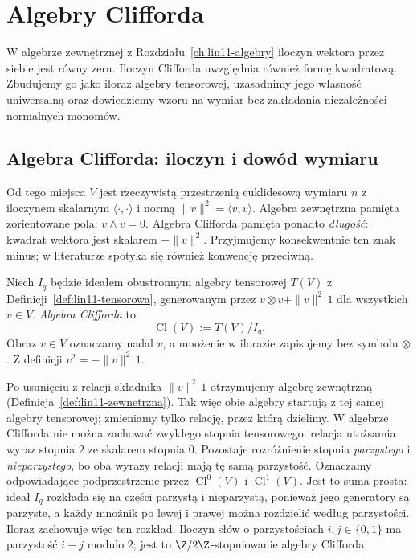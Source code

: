 \chapter{Algebry Clifforda}
\label{ch:lin30-clifford}

W algebrze zewnętrznej z Rozdziału~\ref{ch:lin11-algebry}
iloczyn wektora przez siebie jest równy zeru.
Iloczyn Clifforda uwzględnia również formę kwadratową.
Zbudujemy go jako iloraz algebry tensorowej, uzasadnimy jego
własność uniwersalną oraz dowiedziemy wzoru na wymiar
bez zakładania niezależności normalnych monomów.

\section{Algebra Clifforda: iloczyn i dowód wymiaru}
\label{sec:lin30-clifford}

Od tego miejsca $V$ jest rzeczywistą przestrzenią
euklidesową wymiaru $n$ z iloczynem skalarnym
$\langle\cdot,\cdot\rangle$ i normą
$\|v\|^2=\langle v,v\rangle$. Algebra zewnętrzna
pamięta zorientowane pola: $v\wedge v=0$.
Algebra Clifforda pamięta ponadto \emph{długość}:
kwadrat wektora jest skalarem $-\|v\|^2$.
Przyjmujemy konsekwentnie ten znak minus;
w literaturze spotyka się również konwencję przeciwną.

\begin{definicja}
\label{def:lin30-clifford}
Niech $I_q$ będzie ideałem obustronnym algebry
tensorowej $T(V)$ z Definicji~\ref{def:lin11-tensorowa},
generowanym przez
$v\otimes v+\|v\|^2\,1$ dla wszystkich $v\in V$.
\emph{Algebra Clifforda} to
\[
 \operatorname{Cl}(V):=T(V)/I_q.
\]
Obraz $v\in V$ oznaczamy nadal $v$,
a mnożenie w ilorazie zapisujemy bez symbolu $\otimes$.
Z definicji $v^2=-\|v\|^2\,1$.
\end{definicja}

Po usunięciu z relacji składnika $\|v\|^2\,1$
otrzymujemy algebrę zewnętrzną
(Definicja~\ref{def:lin11-zewnetrzna}).
Tak więc obie algebry startują z tej samej algebry
tensorowej; zmieniamy tylko relację, przez którą
dzielimy. W algebrze Clifforda nie można zachować
zwykłego stopnia tensorowego: relacja utożsamia
wyraz stopnia $2$ ze skalarem stopnia $0$.
Pozostaje rozróżnienie stopnia \emph{parzystego}
i \emph{nieparzystego}, bo oba wyrazy relacji
mają tę samą parzystość.
Oznaczamy odpowiadające podprzestrzenie przez
$\operatorname{Cl}^0(V)$ i $\operatorname{Cl}^1(V)$.
Jest to suma prosta: ideał $I_q$ rozkłada się na części
parzystą i nieparzystą, ponieważ jego generatory są parzyste,
a każdy mnożnik po lewej i prawej można rozdzielić
według parzystości. Iloraz zachowuje więc ten rozkład.
Iloczyn słów o parzystościach $i,j\in\{0,1\}$
ma parzystość $i+j$ modulo $2$; jest to
$\Z/2\Z$-stopniowanie algebry Clifforda.

